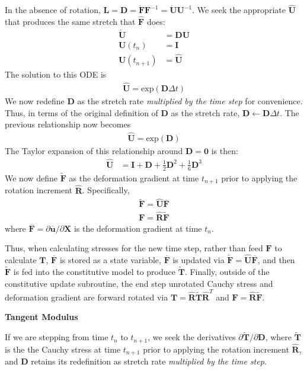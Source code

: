 In the absence of rotation, ${\bm L} = {\bm D} = \dot{\bm F}{\bm F}^{-1} = \dot{\bm U}{\bm U}^{-1}$. We seek the appropriate $\hat{\bm U}$ that produces the same stretch that $\hat{\bm F}$ does:
\begin{align}
\dot{\bm U} &= {\bm D}{\bm U} \\
{\bm U}(t_n) &= {\bm I} \\
{\bm U}(t_{n+1}) &= \hat{\bm U}
\end{align}
The solution to this ODE is
\begin{align}
\hat{\bm U} = \text{exp}({\bm D}\Delta t)
\end{align}
We now redefine ${\bm D}$ as the stretch rate \textit{multiplied by the time step} for convenience. Thus, in terms of the original definition of ${\bm D}$ as the stretch rate, ${\bm D}\leftarrow{\bm D}\Delta t$. The previous relationship now becomes 
\begin{align}
\hat{\bm U} = \text{exp}({\bm D})
\end{align}
The Taylor expansion of this relationship around $\bm{D} = \bm{0}$ is then:
\begin{align}
\hat{\bm {U}} &= {\bm I} + {\bm D} + \frac{1}{2}{\bm D}^2 + \frac{1}{6}{\bm D}^3
\end{align}
We now define $\tilde {\bm F}$ as the deformation gradient at time $t_{n+1}$ prior to applying the rotation increment $\hat{\bm R}$. Specifically,
\begin{align}
\tilde {\bm F} = \hat{\bm U}\overline{\bm F} \\
{\bm F} = \hat{\bm R}\tilde {\bm F}
\end{align}
where $\overline{\bm F} = \partial {\overline{{\bm u}}}/\partial {\bm X}$ is the deformation gradient at time $t_n$.

Thus, when calculating stresses for the new time step, rather than feed ${\bm F}$ to calculate ${\bm T}$, $\overline {\bm F}$ is stored as a state variable, $\overline{\bm F}$ is updated via $\tilde {\bm F} = \hat{\bm U}\overline{\bm F} $, and then $\tilde{\bm{F}}$ is fed into the constitutive model to produce $\tilde{\bm T}$. Finally, outside of the constitutive update subroutine, the end step unrotated Cauchy stress and deformation gradient are forward rotated via ${\bm T} = \hat{\bm R}\tilde{\bm T}\hat{\bm R}^T$ and $\bm{F} = \hat{\bm{R}}\tilde{\bm{F}}$.

\textbf{Tangent Modulus}

If we are stepping from time $t_n$ to $t_{n+1}$, we seek the derivatives $\partial{\tilde{\bm T}}/\partial {\bm D}$, where $\tilde{\bm T}$ is the the Cauchy stress at time $t_{n+1}$ prior to applying the rotation increment $\hat{\bm R}$, and ${\bm D}$ retains its redefinition as stretch rate \textit{multiplied by the time step}.


